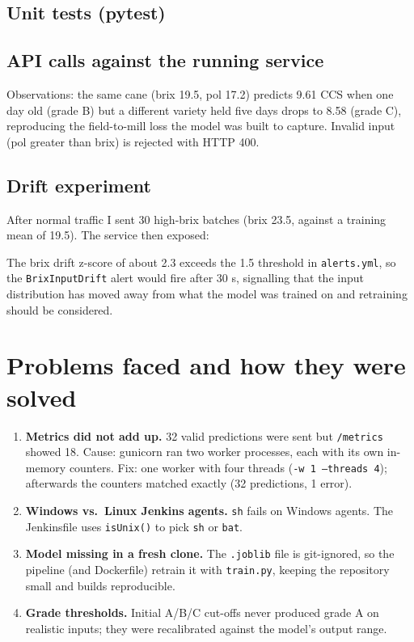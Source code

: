 \documentclass[10pt,a4paper]{article}
\let\oldsection\section
\renewcommand{\section}{\Needspace{14\baselineskip}\oldsection}
\begin{document}
\subsection*{Unit tests (pytest)}


\subsection*{API calls against the running service}


Observations: the same cane (brix 19.5, pol 17.2) predicts 9.61 CCS when one day old (grade B) but a different variety held five days
drops to 8.58 (grade C), reproducing the field-to-mill loss the model was built to capture. Invalid input (pol greater than brix) is rejected with HTTP 400.

\subsection*{Drift experiment}
After normal traffic I sent 30 high-brix batches (brix 23.5, against a training mean of 19.5). The service then exposed:

The brix drift z-score of about 2.3 exceeds the 1.5 threshold in \texttt{alerts.yml}, so the \texttt{BrixInputDrift} alert would fire
after 30 s, signalling that the input distribution has moved away from what the model was trained on and retraining should be considered.

\section{Problems faced and how they were solved}
\begin{enumerate}[leftmargin=14pt]
\item \textbf{Metrics did not add up.} 32 valid predictions were sent but \texttt{/metrics} showed 18. Cause: gunicorn ran two worker processes, each with its own in-memory counters.
 Fix: one worker with four threads (\texttt{-w 1 --threads 4}); afterwards the counters matched exactly (32 predictions, 1 error).
\item \textbf{Windows vs.\ Linux Jenkins agents.} \texttt{sh} fails on Windows agents. The Jenkinsfile uses \texttt{isUnix()} to pick \texttt{sh} or \texttt{bat}.
\item \textbf{Model missing in a fresh clone.} The \texttt{.joblib} file is git-ignored, so the pipeline (and Dockerfile) retrain it with \texttt{train.py}, keeping the repository small and builds reproducible.
\item \textbf{Grade thresholds.} Initial A/B/C cut-offs never produced grade A on realistic inputs; they were recalibrated against the model's output range.
\end{enumerate}
\end{document}
